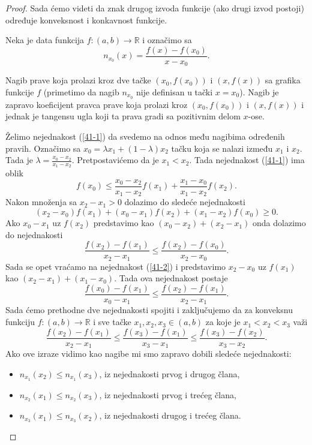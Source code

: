 \documentclass[a4paper,12pt]{article}
\theoremstyle{plain}
\theoremstyle{definition}
\theoremstyle{remark}
\begin{document}
\begin{proof}
    Sada ćemo videti da znak drugog izvoda funkcije (ako drugi izvod postoji) određuje konveksnost i konkavnost funkcije.

Neka je data funkcija $f: (a, b) \to \mathbb{R}$ i označimo sa
$$
n_{x_0}(x) = \frac{f(x) - f(x_0)}{x - x_0}.
$$

Nagib prave koja prolazi kroz dve tačke $(x_0, f(x_0))$ i $(x, f(x))$ sa grafika funkcije $f$ (primetimo da nagib $n_{x_0}$ nije definisan u tački $x = x_0$). Nagib je zapravo koeficijent pravca prave koja prolazi kroz $(x_0, f(x_0))$ i $(x, f(x))$ i jednak je tangensu ugla koji ta prava gradi sa pozitivnim delom $x$-ose.

Želimo nejednakost (\ref{41-1}) da svedemo na odnos među nagibima određenih pravih. Označimo sa $x_0 = \lambda x_1 + (1 - \lambda)x_2$ tačku koja se nalazi između $x_1$ i $x_2$. Tada je $\lambda = \frac{x_0 - x_2}{x_1 - x_2}$. Pretpostavićemo da je $x_1 < x_2$. Tada nejednakost (\ref{41-1}) ima oblik
$$
f(x_0) \leq \frac{x_0 - x_2}{x_1 - x_2} f(x_1) + \frac{x_1 - x_0}{x_1 - x_2} f(x_2).
$$
Nakon množenja sa $x_2 - x_1 > 0$ dolazimo do sledeće nejednakosti
\begin{equation}
(x_2 - x_0)f(x_1) + (x_0 - x_1)f(x_2) + (x_1 - x_2)f(x_0) \geq 0.
\label{41-2}
\end{equation}
Ako $x_0 - x_1$ uz $f(x_2)$ predstavimo kao $(x_0 - x_2) + (x_2 - x_1)$ onda dolazimo do nejednakosti
\begin{equation*}
\frac{f(x_2) - f(x_1)}{x_2 - x_1} \leq \frac{f(x_2) - f(x_0)}{x_2 - x_0}.
\end{equation*}
Sada se opet vraćamo na nejednakost (\ref{41-2}) i predstavimo $x_2 - x_0$ uz $f(x_1)$ kao $(x_2 - x_1) + (x_1 - x_0)$. Tada ova nejednakost postaje
\begin{equation*}
\frac{f(x_0) - f(x_1)}{x_0 - x_1} \leq \frac{f(x_2) - f(x_1)}{x_2 - x_1}.
\end{equation*}
Sada ćemo prethodne dve nejednakosti spojiti i zaključujemo da za konveksnu funkciju \linebreak$f: (a,b) \to \mathbb{R}$ i sve tačke $x_1, x_2, x_3 \in (a,b)$ za koje je $x_1 < x_2 < x_3$ važi
\begin{equation}
\frac{f(x_2) - f(x_1)}{x_2 - x_1} \leq \frac{f(x_3) - f(x_1)}{x_3 - x_1} \leq \frac{f(x_3) - f(x_2)}{x_3 - x_2}.
\end{equation}
Ako ove izraze vidimo kao nagibe mi smo zapravo dobili sledeće nejednakosti:
\begin{itemize}
    \item $n_{x_1}(x_2) \leq n_{x_1}(x_3)$, iz nejednakosti prvog i drugog člana,
    \item $n_{x_2}(x_1) \leq n_{x_2}(x_3)$, iz nejednakosti prvog i trećeg člana,
    \item $n_{x_3}(x_1) \leq n_{x_3}(x_2)$, iz nejednakosti drugog i trećeg člana.
\end{itemize}



\end{proof}
\end{document}
